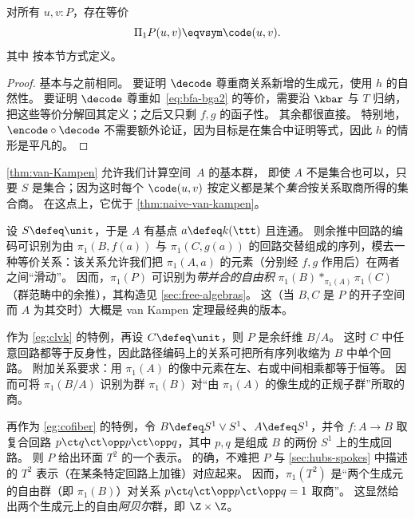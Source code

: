 \begin{thm}\label{thm:van-Kampen}
  对所有 $u,v:P$，存在等价
  \[ \Pi_1P(u,v) \eqvsym \code(u,v). \]
  其中 \code 按本节方式定义。
\end{thm}

\begin{proof}
  基本与之前相同。
  要证明 $\decode$ 尊重商关系新增的生成元，使用 $h$ 的自然性。
  要证明 $\decode$ 尊重如~\eqref{eq:bfa-bga2} 的等价，需要沿 $\kbar$ 与 $T$ 归纳，把这些等价分解回其定义；之后又只剩 $f,g$ 的函子性。
  其余都很直接。
  特别地，$\encode\circ\decode$ 不需要额外论证，因为目标是在集合中证明等式，因此 $h$ 的情形是平凡的。
\end{proof}

%

%
\cref{thm:van-Kampen} 允许我们计算空间~$A$ 的基本群，
即使 $A$ 不是集合也可以，只要 $S$ 是集合；因为这时每个
$\code(u,v)$ 按定义都是某个\emph{集合}按关系取商所得的集合商。
在这点上，它优于
\cref{thm:naive-van-kampen}。

\begin{eg}\label{eg:clvk}
  设 $S\defeq \unit$，于是 $A$ 有基点 $a \defeq k(\ttt)$ 且连通。
  则余推中回路的编码可识别为由 $\pi_1(B,f(a))$ 与 $\pi_1(C,g(a))$ 的回路交替组成的序列，模去一种等价关系：该关系允许我们把 $\pi_1(A,a)$ 的元素（分别经 $f,g$ 作用后）在两者之间“滑动”。
  因而，$\pi_1(P)$ 可识别为\emph{带并合的自由积}
  $\pi_1(B) *_{\pi_1(A)} \pi_1(C)$（群范畴中的余推），其构造见 \cref{sec:free-algebras}。
  这（当 $B,C$ 是 $P$ 的开子空间而 $A$ 为其交时）大概是 van Kampen 定理最经典的版本。
\end{eg}

\begin{eg}\label{eg:cofiber}
  作为 \cref{eg:clvk} 的特例，再设 $C\defeq\unit$，则 $P$ 是余纤维 $B/A$。
  这时 $C$ 中任意回路都等于反身性，因此路径编码上的关系可把所有序列收缩为 $B$ 中单个回路。
  附加关系要求：用 $\pi_1(A)$ 的像中元素在左、右或中间相乘都等于恒等。
  因而可将 $\pi_1(B/A)$ 识别为群 $\pi_1(B)$ 对“由 $\pi_1(A)$ 的像生成的正规子群”所取的商。
\end{eg}

\begin{eg}\label{eg:torus}
  再作为 \cref{eg:cofiber} 的特例，令 $B\defeq S^1 \vee S^1$、$A\defeq S^1$，并令 $f:A\to B$ 取复合回路 $p \ct q \ct \opp p \ct \opp q$，其中 $p,q$ 是组成 $B$ 的两份 $S^1$ 上的生成回路。
  则 $P$ 给出环面 $T^2$ 的一个表示。
  的确，不难把 $P$ 与 \cref{sec:hubs-spokes} 中描述的 $T^2$ 表示（在某条特定回路上加锥）对应起来。
  因而，$\pi_1(T^2)$ 是“两个生成元的自由群（即 $\pi_1(B)$）对关系 $p \ct q \ct \opp p \ct \opp q = 1$ 取商”。
  这显然给出两个生成元上的自由\emph{阿贝尔}群，即 $\Z\times\Z$。
\end{eg}



